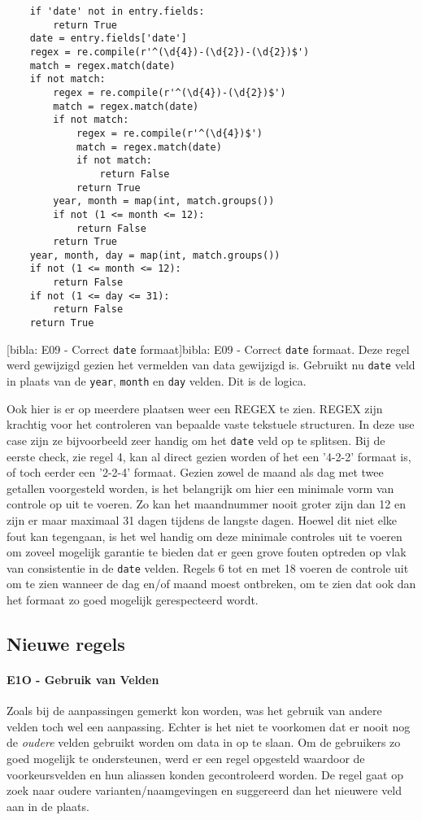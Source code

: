 \begin{verbatim}
    if 'date' not in entry.fields:
        return True
    date = entry.fields['date']
    regex = re.compile(r'^(\d{4})-(\d{2})-(\d{2})$')
    match = regex.match(date)
    if not match:
        regex = re.compile(r'^(\d{4})-(\d{2})$')
        match = regex.match(date)
        if not match:
            regex = re.compile(r'^(\d{4})$')
            match = regex.match(date)
            if not match:
                return False
            return True
        year, month = map(int, match.groups())
        if not (1 <= month <= 12):
            return False
        return True
    year, month, day = map(int, match.groups())
    if not (1 <= month <= 12):
        return False
    if not (1 <= day <= 31):
        return False
    return True
\end{verbatim}
[bibla: E09 - Correct \texttt{date} formaat]{bibla: E09 - Correct \texttt{date} formaat. Deze regel werd gewijzigd gezien het vermelden van data gewijzigd is. Gebruikt nu \texttt{date} veld in plaats van de \texttt{year}, \texttt{month} en \texttt{day} velden. Dit is de logica. \label{lst:bibla_AR_E09}}

Ook hier is er op meerdere plaatsen weer een \acrfull{REGEX} te zien. \acrshort{REGEX} zijn krachtig voor het controleren van bepaalde vaste tekstuele structuren. In deze use case zijn ze bijvoorbeeld zeer handig om het \texttt{date} veld op te splitsen. Bij de eerste check, zie regel 4, kan al direct gezien worden of het een '4-2-2' formaat is, of toch eerder een '2-2-4' formaat. Gezien zowel de maand als dag met twee getallen voorgesteld worden, is het belangrijk om hier een minimale vorm van controle op uit te voeren. Zo kan het maandnummer nooit groter zijn dan 12 en zijn er maar maximaal 31 dagen tijdens de langste dagen. Hoewel dit niet elke fout kan tegengaan, is het wel handig om deze minimale controles uit te voeren om zoveel mogelijk garantie te bieden dat er geen grove fouten optreden op vlak van consistentie in de \texttt{date} velden. Regels 6 tot en met 18 voeren de controle uit om te zien wanneer de dag en/of maand moest ontbreken, om te zien dat ook dan het formaat zo goed mogelijk gerespecteerd wordt.


\subsection{Nieuwe regels}
\paragraph{E1O - Gebruik van Velden}
\label{rule:E10-field-preferences}
Zoals bij de aanpassingen gemerkt kon worden, was het gebruik van andere velden toch wel een aanpassing. Echter is het niet te voorkomen dat er nooit nog de \emph{oudere} velden gebruikt worden om data in op te slaan. Om de gebruikers zo goed mogelijk te ondersteunen, werd er een regel opgesteld waardoor de voorkeursvelden en hun aliassen konden gecontroleerd worden. De regel gaat op zoek naar oudere varianten/naamgevingen en suggereerd dan het nieuwere veld aan in de plaats. 

